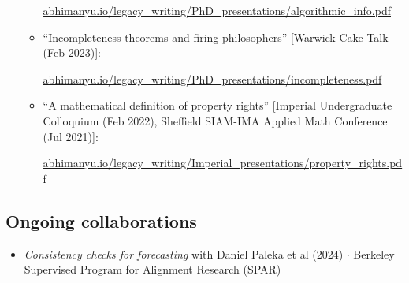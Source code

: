 \documentclass{article}
\newenvironment{relatedwork}
   {
     \begin{mdframed}[
       leftmargin=1cm,
       rightmargin=0cm,
       innerleftmargin=10pt,
       innerrightmargin=0pt,
       innertopmargin=0.5em,
       innerbottommargin=0.5em,
       linewidth=1pt,
       linecolor=gray,
       topline=false,
       bottomline=false,
       rightline=false
     ]
     \footnotesize
   }
   {
     \end{mdframed}
   }
\begin{document}
\begin{relatedwork}
\begin{itemize}[label=—]
\begin{itemize}
                        \href{https://abhimanyu.io/legacy_writing/PhD_presentations/algorithmic_info.pdf}{abhimanyu.io/legacy\_writing/PhD\_presentations/algorithmic\_info.pdf}

                  \item ``Incompleteness theorems and firing philosophers'' [Warwick Cake Talk (Feb 2023)]:

                        \href{https://abhimanyu.io/legacy_writing/PhD_presentations/incompleteness.pdf}{abhimanyu.io/legacy\_writing/PhD\_presentations/incompleteness.pdf}

                  \item ``A mathematical definition of property rights'' [Imperial Undergraduate Colloquium (Feb 2022), Sheffield SIAM-IMA Applied Math Conference (Jul 2021)]:

                        \href{https://abhimanyu.io/legacy_writing/Imperial_presentations/property_rights.pdf}{abhimanyu.io/legacy\_writing/Imperial\_presentations/property\_rights.pdf}
              \end{itemize}
    \end{itemize}
\end{relatedwork}


\subsection*{Ongoing collaborations}

\begin{itemize}

    \item \emph{Consistency checks for forecasting} with Daniel Paleka et al (2024) $\cdot$ Berkeley Supervised Program for Alignment Research (SPAR)

\end{itemize}
\end{document}
